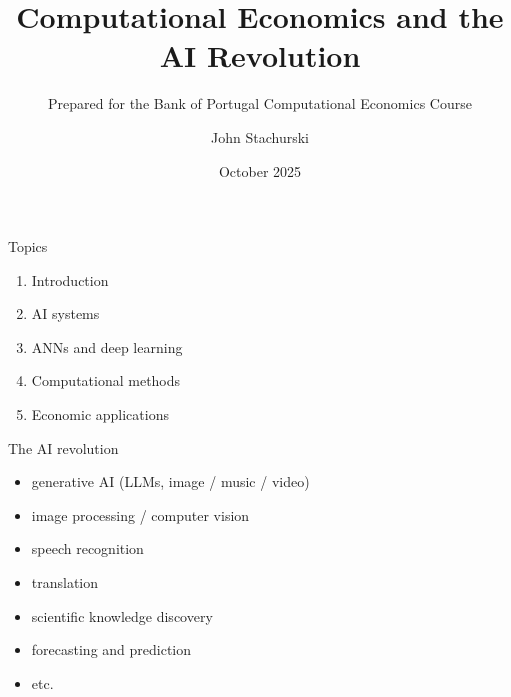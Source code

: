 


\title{Computational Economics and the AI Revolution}
\subtitle{Prepared for the Bank of Portugal Computational Economics Course}


\author{John Stachurski}


\date{October 2025}




\begin{frame}
  \titlepage
\end{frame}



\begin{frame}{Topics}

    \begin{enumerate}
        \item Introduction
        \vspace{0.5em}
        \item AI systems
        \vspace{0.5em}
        \item ANNs and deep learning
        \vspace{0.5em}
        \item Computational methods
        \vspace{0.5em}
        \item Economic applications
    \end{enumerate}

\end{frame}



\begin{frame}{The AI revolution}


    \begin{itemize}
        \item generative AI  (LLMs, image / music / video)
        \vspace{0.5em}
        \item image processing / computer vision
        \vspace{0.5em}
        \item speech recognition
        \vspace{0.5em}
        \item translation
        \vspace{0.5em}
        \item scientific knowledge discovery
        \vspace{0.5em}
        \item forecasting and prediction 
        \vspace{0.5em}
        \item etc.
    \end{itemize}

    
\end{frame}

